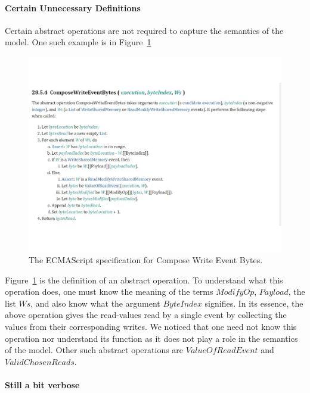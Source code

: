 \paragraph{Certain Unnecessary Definitions}
    Certain abstract operations are not required to capture the semantics of the model. 
    One such example is in Figure~\ref{model:Std2}
    \begin{figure}[H]
        \centering 
        \includegraphics[scale=0.6]{3.ECMAScriptMemoryModel/ECMAScriptStd.pdf}
        \caption{The ECMAScript specification for Compose Write Event Bytes.}
        \label{model:Std2}
    \end{figure}
    Figure~\ref{model:Std2} is the definition of an abstract operation. To understand what this operation does, one must know the meaning of the terms $ModifyOp$, $Payload$, the list $Ws$, and also know what the argument $ByteIndex$ signifies. 
    In its essence, the above operation gives the read-values read by a single event by collecting the values from their corresponding writes. 
    We noticed that one need not know this operation nor understand its function as it does not play a role in the semantics of the model. 
    Other such abstract operations are $ValueOfReadEvent$ and $ValidChosenReads$. 

\paragraph{Still a bit verbose}
    

